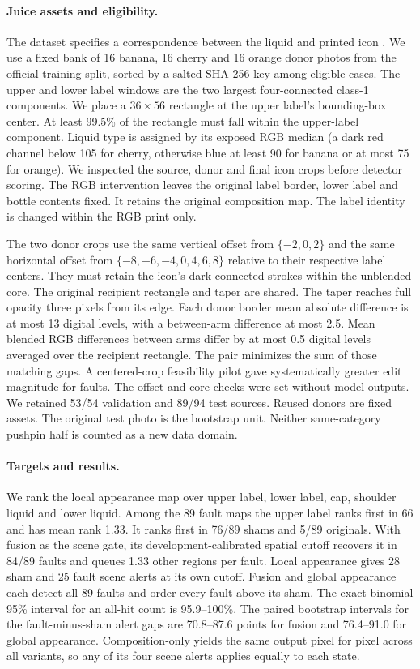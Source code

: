 \paragraph{Juice assets and eligibility.}
The dataset specifies a correspondence between the liquid and printed icon \cite{bergmann2022}. We use a fixed bank of 16 banana, 16 cherry and 16 orange donor photos from the official training split, sorted by a salted SHA-256 key among eligible cases. The upper and lower label windows are the two largest four-connected class-1 components. We place a $36{\times}56$ rectangle at the upper label's bounding-box center. At least 99.5\% of the rectangle must fall within the upper-label component. Liquid type is assigned by its exposed RGB median (a dark red channel below 105 for cherry, otherwise blue at least 90 for banana or at most 75 for orange). We inspected the source, donor and final icon crops before detector scoring. The RGB intervention leaves the original label border, lower label and bottle contents fixed. It retains the original composition map. The label identity is changed within the RGB print only.

The two donor crops use the same vertical offset from $\{-2,0,2\}$ and the same horizontal offset from $\{-8,-6,-4,0,4,6,8\}$ relative to their respective label centers. They must retain the icon's dark connected strokes within the unblended core. The original recipient rectangle and taper are shared. The taper reaches full opacity three pixels from its edge. Each donor border mean absolute difference is at most 13 digital levels, with a between-arm difference at most 2.5. Mean blended RGB differences between arms differ by at most 0.5 digital levels averaged over the recipient rectangle. The pair minimizes the sum of those matching gaps. A centered-crop feasibility pilot gave systematically greater edit magnitude for faults. The offset and core checks were set without model outputs. We retained 53/54 validation and 89/94 test sources. Reused donors are fixed assets. The original test photo is the bootstrap unit. Neither same-category pushpin half is counted as a new data domain.

\paragraph{Targets and results.}
We rank the local appearance map over upper label, lower label, cap, shoulder liquid and lower liquid. Among the 89 fault maps the upper label ranks first in 66 and has mean rank 1.33. It ranks first in 76/89 shams and 5/89 originals. With fusion as the scene gate, its development-calibrated spatial cutoff recovers it in 84/89 faults and queues 1.33 other regions per fault. Local appearance gives 28 sham and 25 fault scene alerts at its own cutoff. Fusion and global appearance each detect all 89 faults and order every fault above its sham. The exact binomial 95\% interval for an all-hit count is 95.9--100\%. The paired bootstrap intervals for the fault-minus-sham alert gaps are 70.8--87.6 points for fusion and 76.4--91.0 for global appearance. Composition-only yields the same output pixel for pixel across all variants, so any of its four scene alerts applies equally to each state.

